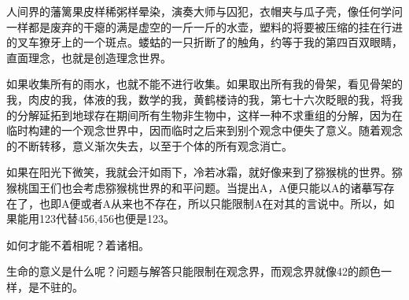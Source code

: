 \documentclass[UTF8]{Diaries}
\begin{document}
人间界的藩篱果皮样稀粥样晕染，演奏大师与囚犯，衣帽夹与瓜子壳，像任何学问一样都是废弃的干瘪的满是虚空的一斤一斤的水壶，塑料的将要被压缩的挂在行进的叉车獠牙上的一个斑点。蝼蛄的一只折断了的触角，约等于我的第四百双眼睛，直面理念，也就是创造理念世界。

如果收集所有的雨水，也就不能不进行收集。如果取出所有我的骨架，看见骨架的我，肉皮的我，体液的我，数学的我，黄鹤楼诗的我，第七十六次眨眼的我，将我的分解延拓到地球存在期间所有生物非生物中，这样一种不求重组的分解，因为在临时构建的一个观念世界中，因而临时之后来到别个观念中便失了意义。随着观念的不断转移，意义渐次失去，以至于个体的所有观念消亡。

如果在阳光下微笑，我就会汗如雨下，冷若冰霜，就好像来到了猕猴桃的世界。猕猴桃国王们也会考虑猕猴桃世界的和平问题。当提出A，A便只能以A的诸摹写存在了，也即A便或者A从来也不存在，所以只能限制A在对其的言说中。所以，如果能用123代替456,456也便是123。

如何才能不着相呢？着诸相。

生命的意义是什么呢？问题与解答只能限制在观念界，而观念界就像42的颜色一样，是不驻的。
\end{document}
